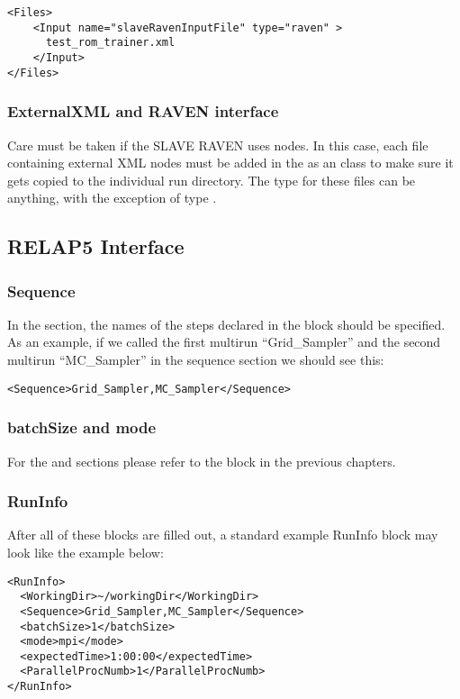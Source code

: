 \begin{lstlisting}[style=XML]
<Files>
    <Input name="slaveRavenInputFile" type="raven" >
      test_rom_trainer.xml
    </Input>
</Files>
\end{lstlisting}

\subsubsection{ExternalXML and RAVEN interface}
Care must be taken if the SLAVE RAVEN uses  nodes.  In this case, each file containing
external XML nodes must be added in the  as an  class  to make sure it gets copied to
the individual run directory.  The type for these files can be anything, with the exception of type
.

\subsection{RELAP5 Interface}
\label{subsec:RELAP5Interface}

\subsubsection{Sequence}
In the  section, the names of the steps declared in the
 block should be specified.
%
As an example, if we called the first multirun ``Grid\_Sampler'' and the second
multirun ``MC\_Sampler'' in the sequence section we should see this:
\begin{lstlisting}[style=XML]
<Sequence>Grid_Sampler,MC_Sampler</Sequence>
\end{lstlisting}

\subsubsection{batchSize and mode}
For the  and  sections please refer to the
 block in the previous chapters.
%
\subsubsection{RunInfo}
After all of these blocks are filled out, a standard example RunInfo block may
look like the example below:
\begin{lstlisting}[style=XML]
<RunInfo>
  <WorkingDir>~/workingDir</WorkingDir>
  <Sequence>Grid_Sampler,MC_Sampler</Sequence>
  <batchSize>1</batchSize>
  <mode>mpi</mode>
  <expectedTime>1:00:00</expectedTime>
  <ParallelProcNumb>1</ParallelProcNumb>
</RunInfo>
\end{lstlisting}
